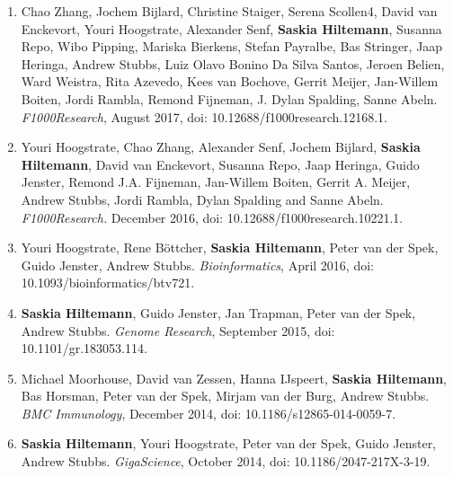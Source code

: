 \begin{enumerate}
\item Chao Zhang, Jochem Bijlard, Christine Staiger, Serena Scollen4, David van Enckevort, Youri Hoogstrate, Alexander Senf, \textbf{Saskia Hiltemann}, Susanna Repo, Wibo Pipping, Mariska Bierkens, Stefan Payralbe, Bas Stringer, Jaap Heringa, Andrew Stubbs, Luiz Olavo Bonino Da Silva Santos, Jeroen Belien, Ward Weistra, Rita Azevedo, Kees van Bochove, Gerrit Meijer, Jan-Willem Boiten, Jordi Rambla, Remond Fijneman, J. Dylan Spalding, Sanne Abeln. {\color{chaptergrey}{Systematically linking tranSMART, Galaxy and EGA for reusing human translational research data.}}  \textit{F1000Research}, August 2017, doi: 10.12688/f1000research.12168.1.

\item Youri Hoogstrate, Chao Zhang, Alexander Senf, Jochem Bijlard, \textbf{Saskia Hiltemann}, David van Enckevort, Susanna Repo, Jaap Heringa, Guido Jenster, Remond J.A. Fijneman, Jan-Willem Boiten, Gerrit A. Meijer, Andrew Stubbs, Jordi Rambla, Dylan Spalding and Sanne Abeln. {\color{chaptergrey}{Integration of EGA secure data access into Galaxy.}}  \textit{F1000Research.} December 2016, doi: 10.12688/f1000research.10221.1.

\item Youri Hoogstrate, Rene Böttcher, \textbf{Saskia Hiltemann}, Peter van der Spek, Guido Jenster, Andrew Stubbs. {\color{chaptergrey}{FuMa: reporting overlap in RNA-seq detected fusion genes.}} \textit{Bioinformatics}, April 2016, doi: 10.1093/bioinformatics/btv721.

\item \textbf{Saskia Hiltemann}, Guido Jenster, Jan Trapman, Peter van der Spek, Andrew Stubbs. {\color{chaptergrey}{Discriminating somatic and germline mutations in tumor DNA samples without matching normals.}} \textit{Genome Research}, September 2015, doi: 10.1101/gr.183053.114. \label{VN}

\item Michael Moorhouse, David van Zessen, Hanna IJspeert, \textbf{Saskia Hiltemann}, Bas Horsman, Peter van der Spek, Mirjam van der Burg, Andrew Stubbs. {\color{chaptergrey}{ImmunoGlobulin galaxy (IGGalaxy) for simple determination and quantitation of immunoglobulin heavy chain rearrangements from NGS.}} \textit{BMC Immunology}, December 2014, doi: 10.1186/s12865-014-0059-7.

\item \textbf{Saskia Hiltemann}, Youri Hoogstrate, Peter van der Spek, Guido Jenster, Andrew Stubbs. {\color{chaptergrey}{iReport: a generalised Galaxy solution for integrated experimental reporting.}} \textit{GigaScience}, October 2014, doi: 10.1186/2047-217X-3-19. \label{ireport}


\end{enumerate}
